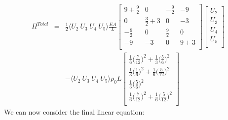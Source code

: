 \documentclass[a4paper]{article}
\begin{document}
\begin{eqnarray*}
\Pi^{Total} & = & \frac{1}{2}\langle U_{2} \ U_{3} \ U_{4} \ U_{5} \rangle \frac{EA}{L} 
\begin{bmatrix}
9 + \frac{9}{2} & 0 & -\frac{9}{2} & -9\\
0 & \frac{3}{2} + 3 & 0 & -3\\
-\frac{9}{2} & 0 & \frac{9}{2} & 0\\
-9 & -3 & 0 & 9 +3\\
\end{bmatrix}
\begin{bmatrix}
U_{2}\\
U_{3}\\
U_{4}\\
U_{5}\\
\end{bmatrix}\\
& & - \langle U_{2} \ U_{3} \ U_{4} \ U_{5} \rangle
\rho_{0}L
\begin{bmatrix}
\frac{1}{6} \big(\frac{7}{12} \big)^{2}+\frac{1}{3} \big(\frac{5}{6}\big)^{2}\\[3pt]
\frac{1}{3} \big(\frac{1}{6} \big)^{2}+\frac{1}{6} \big(\frac{5}{12}\big)^{2}\\[3pt]
\frac{1}{3} \big( \frac{5}{6}\big)^{2}\\[3pt]
\frac{1}{6} \big(\frac{7}{12} \big)^{2}+\frac{1}{6} \big(\frac{5}{12}\big)^{2}\\
\end{bmatrix}
\end{eqnarray*}
We can now consider the final linear equation:
\end{document}
